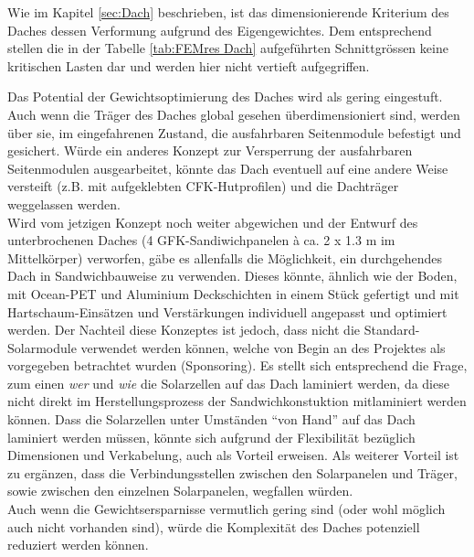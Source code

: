 Wie im Kapitel \ref{sec:Dach} beschrieben, ist das dimensionierende Kriterium des Daches dessen Verformung aufgrund des Eigengewichtes. Dem entsprechend stellen die in der Tabelle \ref{tab:FEMres Dach} aufgeführten Schnittgrössen keine kritischen Lasten dar und werden hier nicht vertieft aufgegriffen.

Das Potential der Gewichtsoptimierung des Daches wird als gering eingestuft. Auch wenn die Träger des Daches global gesehen überdimensioniert sind, werden über sie, im eingefahrenen Zustand, die ausfahrbaren Seitenmodule befestigt und gesichert. Würde ein anderes Konzept zur Versperrung der ausfahrbaren Seitenmodulen ausgearbeitet, könnte das Dach eventuell auf eine andere Weise versteift (z.B. mit aufgeklebten CFK-Hutprofilen) und die Dachträger weggelassen werden.\\
Wird vom jetzigen Konzept noch weiter abgewichen und der Entwurf des unterbrochenen Daches (4 GFK-Sandiwichpanelen à ca. 2 x 1.3 m im Mittelkörper) verworfen, gäbe es allenfalls die Möglichkeit, ein durchgehendes Dach in Sandwichbauweise zu verwenden. Dieses könnte, ähnlich wie der Boden, mit Ocean-PET und Aluminium Deckschichten in einem Stück gefertigt und mit Hartschaum-Einsätzen und Verstärkungen individuell angepasst und optimiert werden. Der Nachteil diese Konzeptes ist jedoch, dass nicht die Standard-Solarmodule verwendet werden können, welche von Begin an des Projektes als vorgegeben betrachtet wurden (Sponsoring). Es stellt sich entsprechend die Frage, zum einen \emph{wer} und \emph{wie} die Solarzellen auf das Dach laminiert werden, da diese nicht direkt im Herstellungsprozess der Sandwichkonstuktion mitlaminiert werden können. Dass die Solarzellen unter Umständen ``von Hand'' auf das Dach laminiert werden müssen, könnte sich aufgrund der Flexibilität bezüglich Dimensionen und Verkabelung, auch als Vorteil erweisen. Als weiterer Vorteil ist zu ergänzen, dass die Verbindungsstellen zwischen den Solarpanelen und Träger, sowie zwischen den einzelnen Solarpanelen, wegfallen würden.\\
Auch wenn die Gewichtsersparnisse vermutlich gering sind (oder wohl möglich auch nicht vorhanden sind), würde die Komplexität des Daches potenziell reduziert werden können.


